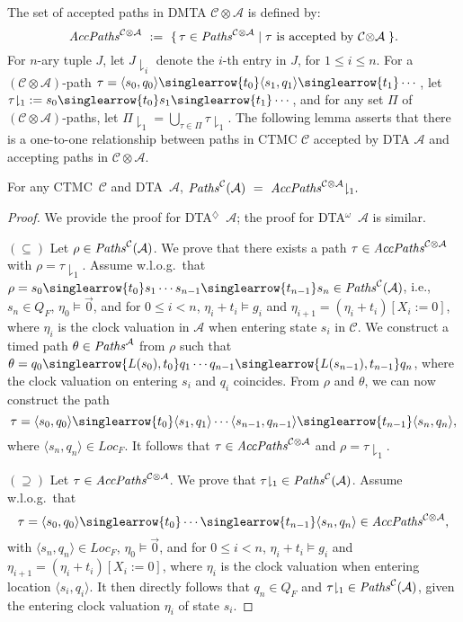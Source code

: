 \documentclass{LMCS}
\newcommand{\mc}[1]{\mathcal{#1}}
\newcommand{\<}{\langle}
\renewcommand{\>}{\rangle}
\newcommand{\les}{\leqslant}
\newcommand{\CTMC}{\textsc{{CTMC}}}
\newcommand{\DTA}{\textsc{DTA}}
\newcommand{\DTAr}{\DTA$^{\!\Ever}$}
\newcommand{\DTAo}{\DTA$^{\omega}$}
\newcommand{\mv}[1]{\singlearrow{#1}}
\newcommand{\Paths}{{\it Paths}}
\newcommand{\AccPaths}{{\it AccPaths}}
\newcommand{\F}{\mathop{\diamondsuit}}
\newcommand{\Ever}{\F}
\begin{document}
The set of accepted paths in DMTA $\mc{C}{\otimes}\mc{A}$ is defined by:
$$
\AccPaths^{\mc{C}\otimes\mc{A}} \ := \
\{\,{\tau\in\Paths^{\mc{C}\otimes\mc{A}}}\mid{\tau \mbox{
is accepted by }\mc{C}{\otimes}\mc{A}}\;\}.
$$
For $n$-ary tuple $J$, let $J{\downharpoonright_i}$ denote the $i$-th
entry in $J$, for $1 \leqslant i \leqslant n$.
For a $(\mc{C}{\otimes}\mc{A})$-path $\tau=\<s_0,q_0\> \mv{t_0} \<s_1,q_1\> \mv{t_1}
\cdots$, let $\tau{\downharpoonright_1} := s_0\mv{t_0}s_1\mv{t_1} \cdots$, and for
any set $\Pi$ of $(\mc{C}{\otimes}\mc{A})$-paths, let
$\Pi{\downharpoonright_1}=\bigcup_{\tau\in\Pi}\tau{\downharpoonright_1}$.
The following lemma asserts that there is a one-to-one relationship between
paths in CTMC $\mc{C}$ accepted by DTA $\mc{A}$ and accepting paths in
$\mc{C} \otimes \mc{A}$.

\begin{lem}\label{lemma:pathcorr}
For any \CTMC\ $\mc{C}$ and \DTA\ $\mc{A}$,
$\Paths^{\mc{C}}(\mc{A}) \ = \ \AccPaths^{\mc{C}\otimes\mc{A}}{\downharpoonright_1}.$
\end{lem}

\begin{proof}
We provide the proof for \DTAr\ $\mc{A}$; the proof for \DTAo\ $\mc{A}$ is similar.
\bigskip

\noindent $(\subseteq)$
Let $\rho \in \Paths^{\mc{C}}(\mc{A})$.
We prove that there exists a path $\tau\in \AccPaths^{\mc{C}\otimes\mc{A}}$ with
$\rho = \tau{\downharpoonright_1}$.
Assume w.l.o.g.\ that $\rho = s_0 \mv{t_0} s_1 \cdots s_{n-1} \mv{t_{n-1}} s_n \in
\Paths^{\mc{C}}(\mc{A})$, i.e., $s_n\in Q_F$, $\eta_0 \models \vec{0}$, and for
$0 \les i < n$, $\eta_i{+}t_i\models g_i$ and $\eta_{i+1} = (\eta_i{+}t_i)[X_i:=0]$,
where $\eta_i$ is the clock valuation in $\mc{A}$ when entering state $s_i$ in $\mc{C}$.
We construct a timed path $\theta \in \Paths^{\mc{A}}$ from $\rho$ such that
$\theta = q_0 \mv{L(s_0), t_0} q_1 \cdots q_{n-1} \mv{L(s_{n-1}), t_{n-1}} q_n$, where
the clock valuation on entering $s_i$ and $q_i$ coincides.
From $\rho$ and $\theta$, we can now construct the path
$$
\tau = \<s_0,q_0\> \mv{t_0} \<s_1,q_1\> \cdots \<s_{n-1},q_{n-1}\> \mv{t_{n-1}}
\<s_n,q_n\>,
$$
where $\<s_n,q_n\> \in Loc_F$.
It follows that $\tau \in \AccPaths^{\mc{C}\otimes\mc{A}}$ and $\rho = \tau{\downharpoonright_1}$.

\bigskip
\noindent $(\supseteq)$
Let $\tau \in \AccPaths^{\mc{C}\otimes\mc{A}}$.
We prove that $\tau{\downharpoonright_1}\in \Paths^{\mc{C}}(\mc{A})$.
Assume w.l.o.g.\ that
$$
\tau = \<s_0,q_0\> \mv{t_0} \cdots \mv{t_{n-1}} \<s_n,q_n\> \in
\AccPaths^{\mc{C}\otimes\mc{A}},
$$
with $\<s_n,q_n\> \in Loc_F$, $\eta_0\models\vec{0}$, and for $0 \les i < n$,
$\eta_i{+}t_i\models g_i$ and $\eta_{i+1}=(\eta_i{+}t_i)[X_i:=0]$, where
$\eta_i$ is the clock valuation when entering location $\<s_i,q_i\>$.
It then directly follows that $q_n\in Q_F$ and $\tau{\downharpoonright_1} \in
\Paths^{\mc{C}}(\mc{A})$, given the entering clock valuation $\eta_i$ of state
$s_i$.
\end{proof}
\end{document}
